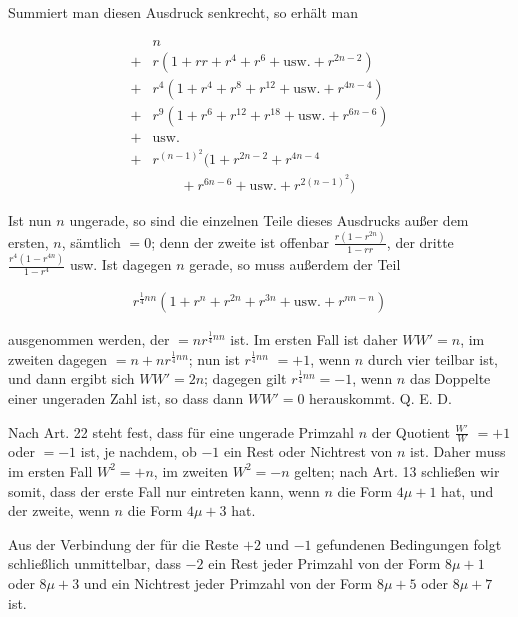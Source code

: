 Summiert man diesen Ausdruck senkrecht, so erhält man

\[
\begin{aligned}
&n\\
+{}&r(1+rr+r^4+r^6+\text{usw.}+r^{2n-2})\\
+{}&r^4(1+r^4+r^8+r^{12}+\text{usw.}+r^{4n-4})\\
+{}&r^9(1+r^6+r^{12}+r^{18}+\text{usw.}+r^{6n-6})\\
+{}&\text{usw.}\\
+{}&r^{(n-1)^2}(1+r^{2n-2}+r^{4n-4}\\&\qquad+r^{6n-6}+\text{usw.}+r^{2(n-1)^2})
\end{aligned}
\]

Ist nun $n$ ungerade, so sind die einzelnen Teile dieses Ausdrucks außer dem ersten, $n$, sämtlich $=0$; denn der zweite ist offenbar $\frac{r(1-r^{2n})}{1-rr}$, der dritte $\frac{r^4(1-r^{4n})}{1-r^4}$ usw. Ist dagegen $n$ gerade, so muss außerdem der Teil


\[
\begin{aligned}
r^{\frac14nn}(1+r^n+r^{2n}+r^{3n}+\text{usw.}+r^{nn-n})
\end{aligned}
\]

ausgenommen werden, der $=nr^{\frac14nn}$ ist. Im ersten Fall ist daher $WW'=n$, im zweiten dagegen $=n+nr^{\frac14nn}$; nun ist $r^{\frac14nn}$ $=+1$, wenn $n$ durch vier teilbar ist, und dann ergibt sich $WW'=2n$; dagegen gilt $r^{\frac14nn}=-1$, wenn $n$ das Doppelte einer ungeraden Zahl ist, so dass dann $WW'=0$ herauskommt. Q. E. D.


Nach Art. 22 steht fest, dass für eine ungerade Primzahl $n$ der Quotient $\frac{W'}{W}$ $=+1$ oder $=-1$ ist, je nachdem, ob $-1$ ein Rest oder Nichtrest von $n$ ist. Daher muss im ersten Fall $W^2=+n$, im zweiten $W^2=-n$ gelten; nach Art. 13 schließen wir somit, dass der erste Fall nur eintreten kann, wenn $n$ die Form $4\mu+1$ hat, und der zweite, wenn $n$ die Form $4\mu+3$ hat.

Aus der Verbindung der für die Reste $+2$ und $-1$ gefundenen Bedingungen folgt schließlich unmittelbar, dass $-2$ ein Rest jeder Primzahl von der Form $8\mu+1$ oder $8\mu+3$ und ein Nichtrest jeder Primzahl von der Form $8\mu+5$ oder $8\mu+7$ ist.

\BookRule{42mm}
